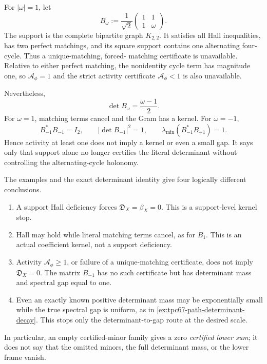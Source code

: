 \begin{example}
\label{ex:tpc67-activity-certificate-failure}
For \(|\omega|=1\), let
\begin{equation}
 B_\omega
 :=
 \frac1{\sqrt2}
 \begin{pmatrix}
  1&1\\
  1&\omega
 \end{pmatrix}.
 \label{eq:tpc67-two-matching-cycle}
\end{equation}
The support is the complete bipartite graph \(K_{2,2}\).  It satisfies
all Hall inequalities, has two perfect matchings, and its square support
contains one alternating four-cycle.  Thus a unique-matching, forced-
matching certificate is unavailable.  Relative to either perfect
matching, the nonidentity cycle term has magnitude one, so
\(\mathcal A_\phi=1\) and the strict activity certificate
\(\mathcal A_\phi<1\) is also unavailable.

Nevertheless,
\begin{equation}
 \det B_\omega=\frac{\omega-1}{2}.
 \label{eq:tpc67-two-matching-determinant}
\end{equation}
For \(\omega=1\), matching terms cancel and the Gram has a kernel.  For
\(\omega=-1\),
\[
 B_{-1}^*B_{-1}=I_2,
 \qquad
 |\det B_{-1}|^2=1,
 \qquad
 \lambda_{\min}(B_{-1}^*B_{-1})=1.
\]
Hence activity at least one does not imply a kernel or even a small
gap.  It says only that support alone no longer certifies the literal
determinant without controlling the alternating-cycle holonomy.
\end{example}

\begin{remark}
\label{rem:tpc67-stop-distinctions}
The examples and the exact determinant identity give four logically
different conclusions.
\begin{enumerate}[label=\textup{(\roman*)},leftmargin=3em]
 \item A support Hall deficiency forces
       \(\mathfrak D_X=\beta_X=0\).  This is a support-level kernel stop.
 \item Hall may hold while literal matching terms cancel, as for
       \(B_1\).  This is an actual coefficient kernel, not a support
       deficiency.
 \item Activity \(\mathcal A_\phi\ge1\), or failure of a unique-matching
       certificate, does not imply
       \(\mathfrak D_X=0\).  The matrix \(B_{-1}\) has no such certificate
       but has determinant mass and spectral gap equal to one.
 \item Even an exactly known positive determinant mass may be
       exponentially small while the true spectral gap is uniform, as
       in \cref{ex:tpc67-path-determinant-decay}.  This stops only the
       determinant-to-gap route at the desired scale.
\end{enumerate}
In particular, an empty certified-minor family gives a zero
\emph{certified lower sum}; it does not say that the omitted minors, the
full determinant mass, or the lower frame vanish.
\end{remark}

